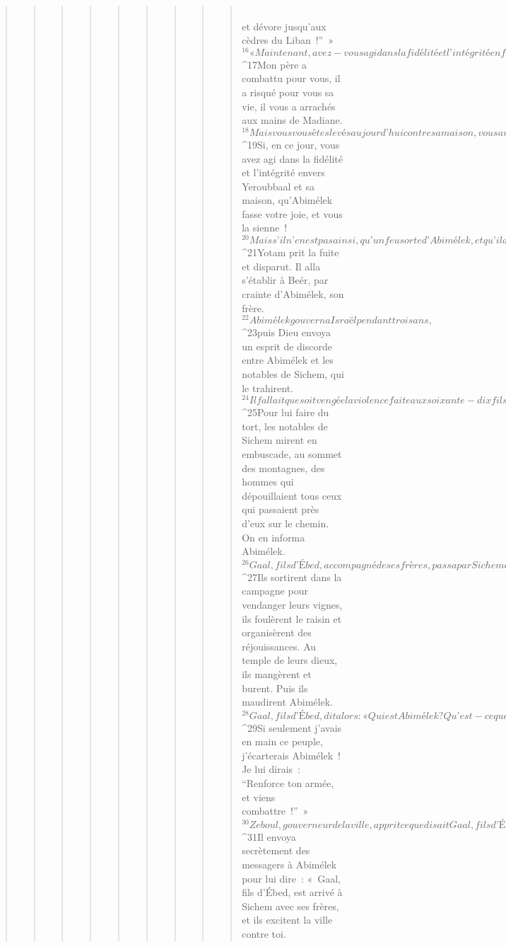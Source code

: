 \begin{verse}
\begin{verse}
\begin{verse}
\begin{verse}
\begin{verse}
\begin{verse}
\begin{verse}
\begin{verse}
\begin{verse}
        \\et dévore jusqu’aux cèdres du Liban !” »
${}^{16}« Maintenant, avez-vous agi dans la fidélité et l’intégrité en faisant roi Abimélek ? Avez-vous bien agi à l’égard de Yeroubbaal et de sa famille ? Avez-vous agi selon le mérite de ses actes ? 
${}^{17}Mon père a combattu pour vous, il a risqué pour vous sa vie, il vous a arrachés aux mains de Madiane. 
${}^{18}Mais vous vous êtes levés aujourd’hui contre sa maison, vous avez tué ses soixante-dix fils sur une même pierre, vous avez proclamé roi, sur les notables de Sichem, Abimélek, le fils de sa servante, parce qu’il est votre frère. 
${}^{19}Si, en ce jour, vous avez agi dans la fidélité et l’intégrité envers Yeroubbaal et sa maison, qu’Abimélek fasse votre joie, et vous la sienne ! 
${}^{20}Mais s’il n’en est pas ainsi, qu’un feu sorte d’Abimélek, et qu’il dévore les notables de Sichem, ainsi que la maison du Terre-Plein ! Et que des notables de Sichem et de la maison du Terre-Plein, un feu sorte pour dévorer Abimélek ! »
${}^{21}Yotam prit la fuite et disparut. Il alla s’établir à Beér, par crainte d’Abimélek, son frère.
${}^{22}Abimélek gouverna Israël pendant trois ans, 
${}^{23}puis Dieu envoya un esprit de discorde entre Abimélek et les notables de Sichem, qui le trahirent. 
${}^{24}Il fallait que soit vengée la violence faite aux soixante-dix fils de Yeroubbaal, et que leur sang retombe sur Abimélek, leur frère, qui les avait tués, et sur les notables de Sichem qui l’avaient soutenu. 
${}^{25}Pour lui faire du tort, les notables de Sichem mirent en embuscade, au sommet des montagnes, des hommes qui dépouillaient tous ceux qui passaient près d’eux sur le chemin. On en informa Abimélek.
${}^{26}Gaal, fils d’Ébed, accompagné de ses frères, passa par Sichem et obtint la confiance de ses notables. 
${}^{27}Ils sortirent dans la campagne pour vendanger leurs vignes, ils foulèrent le raisin et organisèrent des réjouissances. Au temple de leurs dieux, ils mangèrent et burent. Puis ils maudirent Abimélek. 
${}^{28}Gaal, fils d’Ébed, dit alors : « Qui est Abimélek ? Qu’est-ce que Sichem pour que nous servions Abimélek ? N’est-il pas le fils de Yeroubbaal, et Zeboul, son lieutenant ? Servez les hommes de Hamor, père de Sichem. Pourquoi, nous autres, servirions-nous celui-là ? 
${}^{29}Si seulement j’avais en main ce peuple, j’écarterais Abimélek ! Je lui dirais : “Renforce ton armée, et viens combattre !” »
${}^{30}Zeboul, gouverneur de la ville, apprit ce que disait Gaal, fils d’Ébed. Il se mit en colère. 
${}^{31}Il envoya secrètement des messagers à Abimélek pour lui dire : « Gaal, fils d’Ébed, est arrivé à Sichem avec ses frères, et ils excitent la ville contre toi. 

\end{verse}
\end{verse}
\end{verse}
\end{verse}
\end{verse}
\end{verse}
\end{verse}
\end{verse}
\end{verse}
